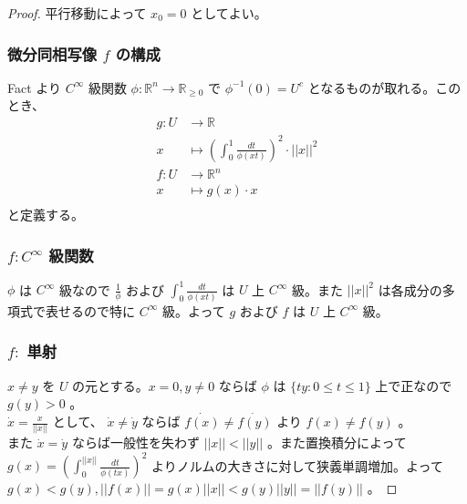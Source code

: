 \documentclass[a4paper,10pt]{jsarticle}
\begin{document}
\begin{proof}
  平行移動によって $x_0=0$ としてよい。

  \subsubsection*{微分同相写像 $f$ の構成}
  Fact より $C^\infty$ 級関数 $\phi:\mathbb{R}^n \to \mathbb{R}_{\geq 0}$ で $\phi^{-1}(0)=U^c$ となるものが取れる。このとき、
  \begin{align*}
    g:U &\to \mathbb{R} \\
    x &\mapsto (\int_{0}^1 \frac{dt}{\phi(xt)})^2 \cdot ||x||^2 \\
    f:U &\to \mathbb{R}^n \\
    x &\mapsto g(x)\cdot x \\
  \end{align*}
  と定義する。 

  \subsubsection*{$f:C^\infty$ 級関数}
  $\phi$ は $C^\infty$ 級なので $\frac{1}{\phi}$ および $\int_{0}^1 \frac{dt}{\phi(xt)}$ は $U$ 上 $C^\infty$ 級。また $||x||^2$ は各成分の多項式で表せるので特に $C^\infty$ 級。よって $g$ および $f$ は $U$ 上 $C^\infty$ 級。
  
  \subsubsection*{$f:$ 単射}
  $x \neq y$ を $U$ の元とする。$x=0,y \neq 0$ ならば $\phi$ は $\{ty:0 \leq t \leq 1\}$ 上で正なので $g(y)>0$ 。 \\
  $\dot{x}=\frac{x}{||x||}$ として、 $\dot{x} \neq \dot{y}$ ならば $\dot{f(x)} \neq \dot{f(y)}$ より $f(x) \neq f(y)$ 。 \\
  また $\dot{x}=\dot{y}$ ならば一般性を失わず $||x||<||y||$ 。また置換積分によって $g(x)=(\int_{0}^{||x||} \frac{dt}{\phi(t\dot{x})})^2$ よりノルムの大きさに対して狭義単調増加。よって $g(x)<g(y),||f(x)||=g(x)||x||<g(y)||y||=||f(y)||$ 。
  

\end{proof}
\end{document}
